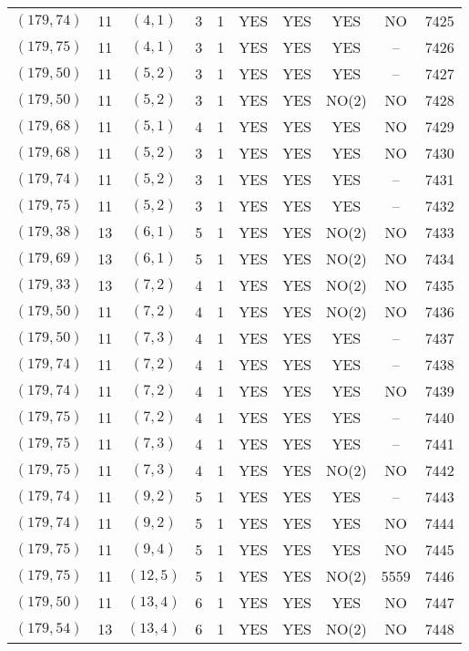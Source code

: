 \begin{longtable}{|c|c|c|c|c|c|c|c|c|c|}
$(179, 74)$ & 11 & $(4, 1)$ & 3 & 1 & YES & YES & YES & NO & 7425\\
$(179, 75)$ & 11 & $(4, 1)$ & 3 & 1 & YES & YES & YES & -- & 7426\\
$(179, 50)$ & 11 & $(5, 2)$ & 3 & 1 & YES & YES & YES & -- & 7427\\
$(179, 50)$ & 11 & $(5, 2)$ & 3 & 1 & YES & YES & NO(2) & NO & 7428\\
$(179, 68)$ & 11 & $(5, 1)$ & 4 & 1 & YES & YES & YES & NO & 7429\\
$(179, 68)$ & 11 & $(5, 2)$ & 3 & 1 & YES & YES & YES & NO & 7430\\
$(179, 74)$ & 11 & $(5, 2)$ & 3 & 1 & YES & YES & YES & -- & 7431\\
$(179, 75)$ & 11 & $(5, 2)$ & 3 & 1 & YES & YES & YES & -- & 7432\\
$(179, 38)$ & 13 & $(6, 1)$ & 5 & 1 & YES & YES & NO(2) & NO & 7433\\
$(179, 69)$ & 13 & $(6, 1)$ & 5 & 1 & YES & YES & NO(2) & NO & 7434\\
$(179, 33)$ & 13 & $(7, 2)$ & 4 & 1 & YES & YES & NO(2) & NO & 7435\\
$(179, 50)$ & 11 & $(7, 2)$ & 4 & 1 & YES & YES & NO(2) & NO & 7436\\
$(179, 50)$ & 11 & $(7, 3)$ & 4 & 1 & YES & YES & YES & -- & 7437\\
$(179, 74)$ & 11 & $(7, 2)$ & 4 & 1 & YES & YES & YES & -- & 7438\\
$(179, 74)$ & 11 & $(7, 2)$ & 4 & 1 & YES & YES & YES & NO & 7439\\
$(179, 75)$ & 11 & $(7, 2)$ & 4 & 1 & YES & YES & YES & -- & 7440\\
$(179, 75)$ & 11 & $(7, 3)$ & 4 & 1 & YES & YES & YES & -- & 7441\\
$(179, 75)$ & 11 & $(7, 3)$ & 4 & 1 & YES & YES & NO(2) & NO & 7442\\
$(179, 74)$ & 11 & $(9, 2)$ & 5 & 1 & YES & YES & YES & -- & 7443\\
$(179, 74)$ & 11 & $(9, 2)$ & 5 & 1 & YES & YES & YES & NO & 7444\\
$(179, 75)$ & 11 & $(9, 4)$ & 5 & 1 & YES & YES & YES & NO & 7445\\
$(179, 75)$ & 11 & $(12, 5)$ & 5 & 1 & YES & YES & NO(2) & 5559 & 7446\\
$(179, 50)$ & 11 & $(13, 4)$ & 6 & 1 & YES & YES & YES & NO & 7447\\
$(179, 54)$ & 13 & $(13, 4)$ & 6 & 1 & YES & YES & NO(2) & NO & 7448\\

\end{longtable}
